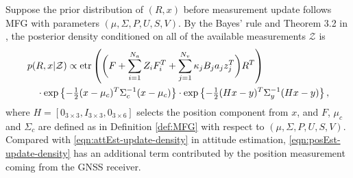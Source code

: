 Suppose the prior distribution of $(R,x)$ before measurement update follows MFG with parameters $(\mu,\Sigma,P,U,S,V)$. 
By the Bayes' rule and Theorem 3.2 in \cite{lee2018bayesian}, the posterior density conditioned on all of the available measurements $\mathcal{Z}$ is 
\begin{align} \label{eqn:posEst-update-density}
	&p(R,x\lvert \mathcal{Z}) \propto \mathrm{etr}\left(  \bigg( F + \sum_{i=1}^{N_a}Z_iF_i^T + \sum_{j=1}^{N_v}\kappa_jB_ja_jz_j^T \bigg)R^T  \right) \nonumber \\
	&\quad \cdot \exp\left\{ -\tfrac{1}{2}(x-\mu_c)^T\Sigma_c^{-1}(x-\mu_c) \right\} \cdot \exp\left\{ -\tfrac{1}{2}(Hx-y)^T\Sigma_y^{-1}(Hx-y) \right\},
\end{align}
where $H = [0_{3\times 3}, I_{3\times 3}, 0_{3\times 6}]$ selects the position component from $x$, and $F$, $\mu_c$ and $\Sigma_c$ are defined as in Definition \ref{def:MFG} with respect to $(\mu,\Sigma,P,U,S,V)$.
Compared with \eqref{eqn:attEst-update-density} in attitude estimation, \eqref{eqn:posEst-update-density} has an additional term contributed by the position measurement coming from the GNSS receiver.


